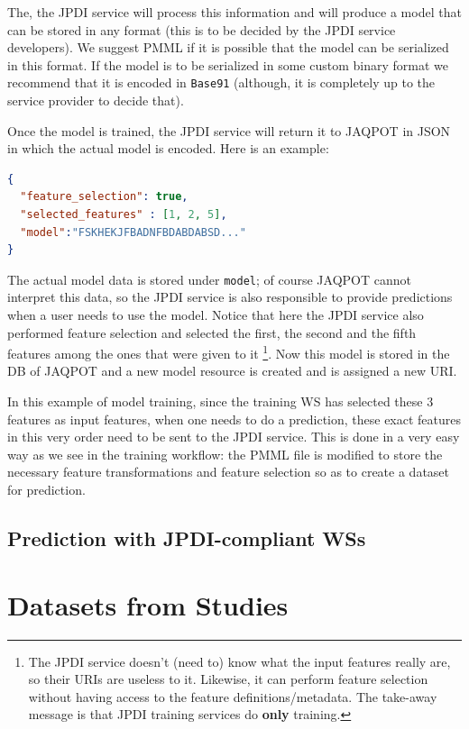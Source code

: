 The, the JPDI service will process this information and will
produce a model that can be stored in any format (this is to 
be decided by the JPDI service developers). We suggest PMML 
if it is possible that the model can be serialized in this 
format. If the model is to be serialized in some custom binary
format we recommend that it is encoded in \texttt{Base91} (although,
it is completely up to the service provider to decide that).


Once the model is trained, the JPDI service will return it
to JAQPOT in JSON in which the actual model is encoded.
Here is an example:

\begin{lstlisting}[language=json]
{
  "feature_selection": true,
  "selected_features" : [1, 2, 5],
  "model":"FSKHEKJFBADNFBDABDABSD..."
} 
\end{lstlisting}

The actual model data is stored under \texttt{model}; of course
JAQPOT cannot interpret this data, so the JPDI service is also 
responsible to provide predictions when a user needs to use 
the model. Notice that here the JPDI service also performed 
feature selection and selected the first, the 
second and the fifth features among the ones that were given to it%
\footnote{The JPDI service doesn't (need to) know what the input features
really are, so their URIs are useless to it. Likewise, it can perform
feature selection without having access to the feature definitions/metadata.
The take-away message is that JPDI training services do \textbf{only} training.}.
Now this model is stored in the DB of JAQPOT and a new model resource is created
and is assigned a new URI.

In this example of model training, since the training
WS has selected these 3 features as input features, 
when one needs to do a prediction, these exact features 
in this very order need to be sent to the JPDI service.
This is done in a very easy way as we see in the training 
workflow: the PMML file is modified to store the necessary
feature transformations and feature selection so as to
create a dataset for prediction.





\section{Prediction with JPDI-compliant WSs}


\chapter{Datasets from Studies}

